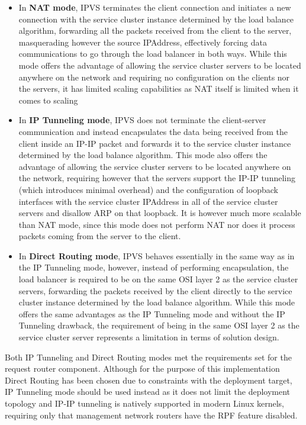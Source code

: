 \begin{itemize}
	\item In \textbf{\gls{NAT} mode}, \gls{IPVS} terminates the client connection and initiates a new connection with the service cluster instance determined by the load balance algorithm, forwarding all the packets received from the client to the server, masquerading however the source \gls{IPAddress}, effectively forcing data communications to go through the load balancer in both ways. While this mode offers the advantage of allowing the service cluster servers to be located anywhere on the network and requiring no configuration on the clients nor the servers, it has limited scaling capabilities as \gls{NAT} itself is limited when it comes to scaling
	\item In \textbf{IP Tunneling mode}, \gls{IPVS} does not terminate the client-server communication and instead encapsulates the data being received from the client inside an IP-IP packet and forwards it to the service cluster instance determined by the load balance algorithm. This mode also offers the advantage of allowing the service cluster servers to be located anywhere on the network, requiring however that the servers support the IP-IP tunneling (which introduces minimal overhead) and the configuration of loopback interfaces with the service cluster \gls{IPAddress} in all of the service cluster servers and disallow \gls{ARP} on that loopback. It is however much more scalable than \gls{NAT} mode, since this mode does not perform \gls{NAT} nor does it process packets coming from the server to the client.
	\item In \textbf{Direct Routing mode}, \gls{IPVS} behaves essentially in the same way as in the IP Tunneling mode, however, instead of performing encapsulation, the load balancer is required to be on the same \gls{OSI} layer 2 as the service cluster servers, forwarding the packets received by the client directly to the service cluster instance determined by the load balance algorithm. While this mode offers the same advantages as the IP Tunneling mode and without the IP Tunneling drawback, the requirement of being in the same \gls{OSI} layer 2 as the service cluster server represents a limitation in terms of solution design.
\end{itemize}	
%
Both IP Tunneling and Direct Routing modes met the requirements set for the request router component.
Although for the purpose of this implementation Direct Routing has been chosen due to constraints with the deployment target, IP Tunneling mode should be used instead as it does not limit the deployment topology and IP-IP tunneling is natively supported in modern Linux kernels, requiring only that management network routers have the \gls{RPF} feature disabled.
